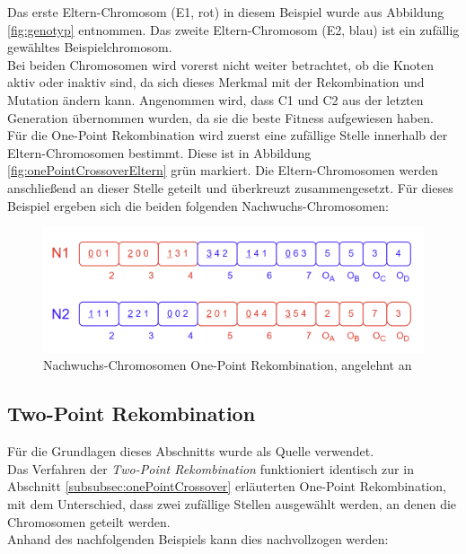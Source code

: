 Das erste Eltern-Chromosom (E1, rot) in diesem Beispiel wurde aus Abbildung \ref{fig:genotyp} entnommen.
Das zweite Eltern-Chromosom (E2, blau) ist ein zufällig gewähltes Beispielchromosom.\\
Bei beiden Chromosomen wird vorerst nicht weiter betrachtet, ob die Knoten aktiv oder inaktiv sind, da sich dieses Merkmal mit der Rekombination und Mutation ändern kann.
Angenommen wird, dass C1 und C2 aus der letzten Generation übernommen wurden, da sie die beste Fitness aufgewiesen haben.\\
Für die One-Point Rekombination wird zuerst eine zufällige Stelle innerhalb der Eltern-Chromosomen bestimmt.
Diese ist in Abbildung \ref{fig:onePointCrossoverEltern} grün markiert.
Die Eltern-Chromosomen werden anschließend an dieser Stelle geteilt und überkreuzt zusammengesetzt.
Für dieses Beispiel ergeben sich die beiden folgenden Nachwuchs-Chromosomen:

\begin{figure}[H]
    \centering
    \includegraphics[scale = 0.5]{Bilder/BeispielOnePointCrossover2.png}
    \caption{Nachwuchs-Chromosomen One-Point Rekombination, angelehnt an \cite{torabi_using_2022}}
    \label{fig:onePointCrossoverNachwuchs}
\end{figure}

\subsection{Two-Point Rekombination}
\label{subsubsec:twoPointCrossover}

Für die Grundlagen dieses Abschnitts wurde \cite{pavai_survey_2017} als Quelle verwendet.\\
Das Verfahren der \emph{Two-Point Rekombination} funktioniert identisch zur in Abschnitt \ref{subsubsec:onePointCrossover} erläuterten One-Point Rekombination, mit dem Unterschied, dass zwei zufällige Stellen ausgewählt werden, an denen die Chromosomen geteilt werden.\\
Anhand des nachfolgenden Beispiels kann dies nachvollzogen werden:

